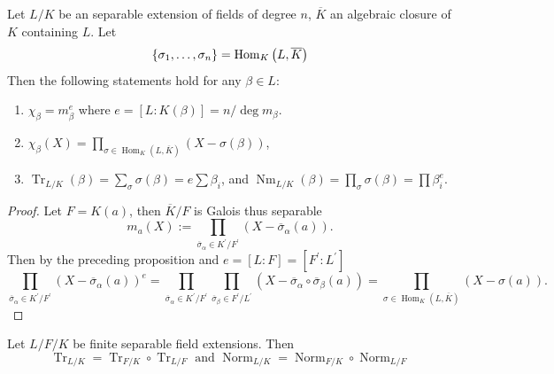 \documentclass[12pt, oneside]{book}
\begin{document}
\begin{proposition}
    Let $L / K$ be an separable extension of fields of degree $n$, $\overline{K}$ an algebraic closure of $K$ containing $L$.
    Let
    \begin{equation*}
        \left\{\sigma_1,\ldots,\sigma_n\right\}
        =
        \operatorname{\operatorname{Hom}}_{K}\left( L, \overline{K}\right)
    \end{equation*}
    Then the following statements hold for any $\beta \in L$:
    \begin{enumerate}
        \item
              $\chi_\beta=m_\beta^e$ where $e=[L: K(\beta)]=n/\deg m_\beta$.
        \item
              $\chi_\beta(X)=\prod_{\sigma \in \operatorname{Hom}_K(L, \overline{K})}(X-\sigma(\beta))$,
        \item
              $\operatorname{Tr}_{L / K}(\beta)=\sum_{\sigma} \sigma(\beta)=e\sum \beta_i $, and
              $\operatorname{Nm}_{L / K}(\beta)=\prod_{\sigma} \sigma(\beta)=\prod \beta_i^e$.
    \end{enumerate}
    \begin{proof}
        Let $F=K(a)$, then $\overline{K}/F$ is Galois thus separable
        \begin{equation*}
            m_a(X)
            :=
            \prod_{\overline{\sigma}_\alpha \in K^\prime/F^\prime}\left(X-\overline{\sigma}_\alpha(a)\right) .
        \end{equation*}
        Then by the preceding proposition and $e=\left[L:F\right]=\left[F^\prime:L^\prime\right]$
        \begin{equation*}
            \prod_{\overline{\sigma}_\alpha \in K^\prime/F^\prime}\left(X-\overline{\sigma}_\alpha(a)\right)^e
            =
            \prod_{\overline{\sigma}_\alpha \in K^\prime/F^\prime}
            \prod_{\overline{\sigma}_\beta \in F^\prime/L^\prime}
            \left(X-\overline{\sigma}_\alpha \circ \overline{\sigma}_\beta(a)\right)=\prod_{\sigma \in \operatorname{Hom}_K(L, \overline{K})}(X-\sigma(a)) .
        \end{equation*}
    \end{proof}
\end{proposition}

\begin{corollary}
    Let $L / F / K$  be finite separable field extensions. Then
    \begin{equation*}
        \operatorname{Tr}_{L / K}=\operatorname{Tr}_{F / K} \circ \operatorname{Tr}_{L / F} \text { and } \operatorname{Norm}_{L / K}=\operatorname{Norm}_{F / K} \circ \operatorname{Norm}_{L / F}
    \end{equation*}
\end{corollary}
\end{document}
